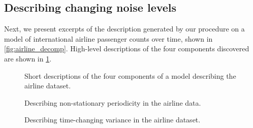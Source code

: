 \newpage

\subsection{Describing changing noise levels} %
\label{sec:airline}


Next, we present excerpts of the description generated by our procedure on a model of international airline passenger counts over time, shown in \cref{fig:airline_decomp}.
%
High-level descriptions of the four components discovered are shown in \cref{fig:exec-airline}.

\begin{figure}[ht!]
\centering
{}
\caption[Short descriptions of the four components of the airline model]
{Short descriptions of the four components of a model describing the airline dataset.}
\label{fig:exec-airline}
\end{figure}

\begin{figure}[ht!]
\centering
{}
\caption[Describing non-stationary periodicity in the airline data]
{Describing non-stationary periodicity in the airline data.}
\label{fig:lin_periodic}
\end{figure}

\begin{figure}[ht!]
\centering
{}
\caption[Describing time-changing variance in the airline dataset]
{Describing time-changing variance in the airline dataset.}
\label{fig:heteroscedastic}
\end{figure}

